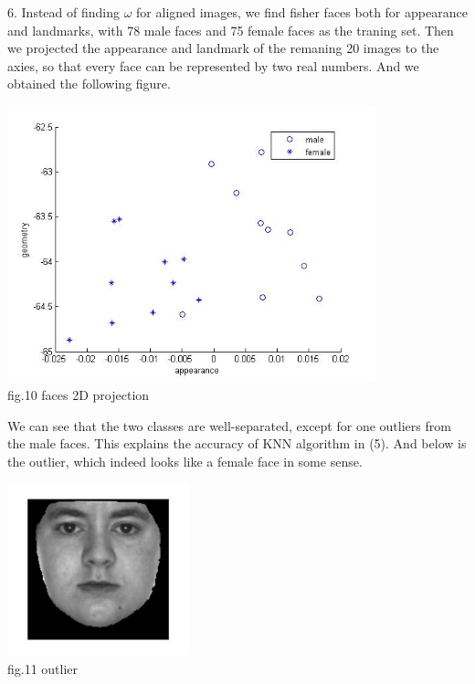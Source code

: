 \documentclass[12pt]{article}
\newenvironment{problem}[2][Part]{\begin{trivlist}
\item[\hskip \labelsep {\bfseries #1}\hskip \labelsep {\bfseries #2}]}{\end{trivlist}}
\begin{document}
\begin{problem}{2. Fisher faces for gender discrimination}
\item{6.}
Instead of finding $\omega$ for aligned images, we find fisher faces both for appearance and landmarks, with 78 male faces and 75 female faces as the traning set. Then we projected the appearance and landmark of the remaning 20 images to the axies, so that every face can be represented by two real numbers. And we obtained the following figure.
\begin{center}
	\includegraphics[height=8cm]{visualization.jpg}{\\fig.10 faces 2D projection}
\end{center}
We can see that the two classes are well-separated, except for one outliers from the male faces. This explains the accuracy of KNN algorithm in (5). And below is the outlier, which indeed looks like a female face in some sense.
\begin{center}
	\includegraphics[height=5cm]{outlier.jpg}{\\fig.11 outlier}
\end{center}

\end{problem}

 
\end{document}
